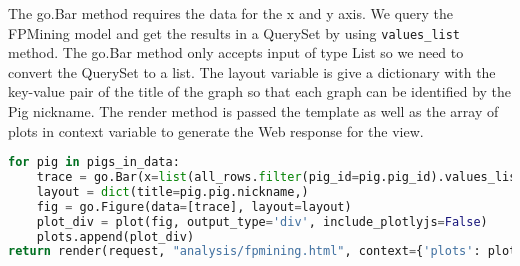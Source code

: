 The go.Bar method requires the data for the x and y axis. We query the FPMining model and get the results in a QuerySet by using \texttt{values\_list}
method. The go.Bar method only accepts input of type List so we need to convert the QuerySet to a list.
The layout variable is give a dictionary with the key-value pair of the title of the graph so that each graph can be identified by the Pig nickname.
The render method is passed the template as well as the array of plots in context variable to generate the Web response for the view.

\begin{lstlisting}[language={Python}]
for pig in pigs_in_data:
	trace = go.Bar(x=list(all_rows.filter(pig_id=pig.pig_id).values_list('itemset', flat=True)), y=list(all_rows.filter(pig_id=pig.pig_id).values_list('support', flat=True)))
	layout = dict(title=pig.pig.nickname,)
	fig = go.Figure(data=[trace], layout=layout)
	plot_div = plot(fig, output_type='div', include_plotlyjs=False)
	plots.append(plot_div)
return render(request, "analysis/fpmining.html", context={'plots': plots})
\end{lstlisting}